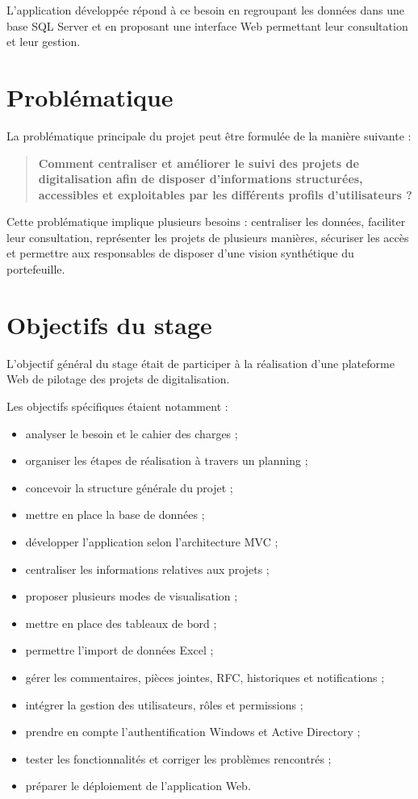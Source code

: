 \documentclass[12pt,a4paper,oneside]{report}
\begin{document}
L'application développée répond à ce besoin en regroupant les données dans une base SQL Server et en proposant une interface Web permettant leur consultation et leur gestion.

\section{Problématique}

La problématique principale du projet peut être formulée de la manière suivante :

\begin{quote}
\textbf{Comment centraliser et améliorer le suivi des projets de digitalisation afin de disposer d'informations structurées, accessibles et exploitables par les différents profils d'utilisateurs ?}
\end{quote}

Cette problématique implique plusieurs besoins : centraliser les données, faciliter leur consultation, représenter les projets de plusieurs manières, sécuriser les accès et permettre aux responsables de disposer d'une vision synthétique du portefeuille.

\section{Objectifs du stage}

L'objectif général du stage était de participer à la réalisation d'une plateforme Web de pilotage des projets de digitalisation.

Les objectifs spécifiques étaient notamment :

\begin{itemize}
    \item analyser le besoin et le cahier des charges ;
    \item organiser les étapes de réalisation à travers un planning ;
    \item concevoir la structure générale du projet ;
    \item mettre en place la base de données ;
    \item développer l'application selon l'architecture MVC ;
    \item centraliser les informations relatives aux projets ;
    \item proposer plusieurs modes de visualisation ;
    \item mettre en place des tableaux de bord ;
    \item permettre l'import de données Excel ;
    \item gérer les commentaires, pièces jointes, RFC, historiques et notifications ;
    \item intégrer la gestion des utilisateurs, rôles et permissions ;
    \item prendre en compte l'authentification Windows et Active Directory ;
    \item tester les fonctionnalités et corriger les problèmes rencontrés ;
    \item préparer le déploiement de l'application Web.
\end{itemize}
\end{document}
